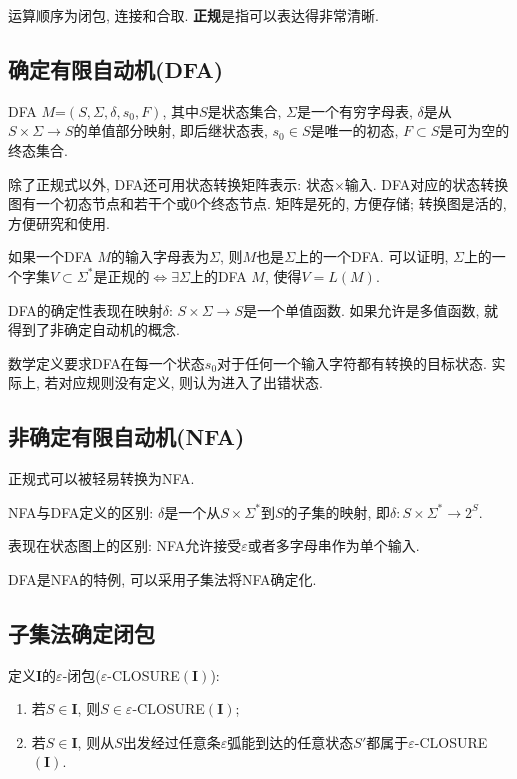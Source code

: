     运算顺序为闭包, 连接和合取. \textbf{正规}是指可以表达得非常清晰.

    \subsection{确定有限自动机(DFA)}

        DFA $M$=$(S,\Sigma,\delta,s_0,F)$, 其中$S$是状态集合, $\Sigma$是一个有穷字母表, $\delta$是从$S\times\Sigma\to S$的单值部分映射, 即后继状态表, $s_0\in S$是唯一的初态, $F\subset S$是可为空的终态集合.

        除了正规式以外, DFA还可用\textsf{状态转换矩阵}表示: 状态$\times$输入. DFA对应的\textsf{状态转换图}有一个初态节点和若干个或0个终态节点. 矩阵是死的, 方便存储; 转换图是活的, 方便研究和使用.

        如果一个DFA $M$的输入字母表为$\Sigma$, 则$M$也是$\Sigma$上的一个DFA. 可以证明, $\Sigma$上的一个字集$V\subset\Sigma^*$是正规的$\iff \exists\Sigma$上的DFA $M$, 使得$V=L(M)$.

        DFA的\textsf{确定性}表现在映射$\delta$: $S\times\Sigma\to S$是一个\textsf{单值函数}. 如果允许是多值函数, 就得到了非确定自动机的概念.

        数学定义要求DFA在每一个状态$s_0$对于任何一个输入字符都有转换的目标状态. 实际上, 若对应规则没有定义, 则认为进入了\textsf{出错}状态.

    \subsection{非确定有限自动机(NFA)}
        
        正规式可以被轻易转换为NFA.

        NFA与DFA定义的区别: $\delta$是一个从$S\times\Sigma^*$到$S$的子集的映射, 即$\delta: S\times\Sigma^*\to2^S$.

        表现在状态图上的区别: NFA允许接受$\varepsilon$或者多字母串作为单个输入. 

        DFA是NFA的特例, 可以采用子集法将NFA确定化.

    \subsection{子集法确定闭包}

        定义$\mathbf{I}$的$\varepsilon$-闭包($\varepsilon$-CLOSURE$(\mathbf{I})$):
        \begin{enumerate}
            \item 若$S\in \mathbf{I}$, 则$S\in \varepsilon$-CLOSURE$(\mathbf{I})$;
            \item 若$S\in \mathbf{I}$, 则从$S$出发经过任意条$\varepsilon$弧能到达的任意状态$S'$都属于$\varepsilon$-CLOSURE$(\mathbf{I})$.
        \end{enumerate}

